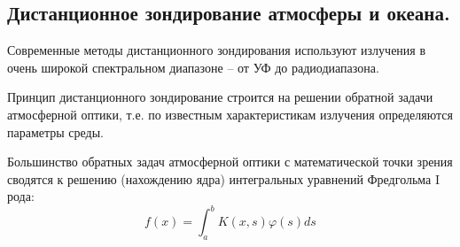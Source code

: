 \subsection{Дистанционное зондирование атмосферы и океана.}\label{q7-5}
Современные методы дистанционного зондирования используют излучения в очень широкой спектральном диапазоне -- от УФ до радиодиапазона.

Принцип дистанционного зондирование строится на решении обратной задачи атмосферной оптики, т.е. по известным характеристикам излучения определяются параметры среды.

Большинство обратных задач атмосферной оптики с математической точки зрения сводятся к решению (нахождению ядра) интегральных уравнений Фредгольма I рода:
\begin{equation}
f(x)=\int^b_a K(x,s)\varphi(s)ds
\end{equation}
